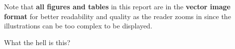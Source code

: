 \documentclass{article}
\begin{document}
Note that \textbf{all figures and tables} in this report are in the \textbf{vector image format} for better readability and quality as the reader zooms in since the illustrations can be too complex to be displayed.







\newpage
{}



What the hell is this?

\newpage


\end{document}
